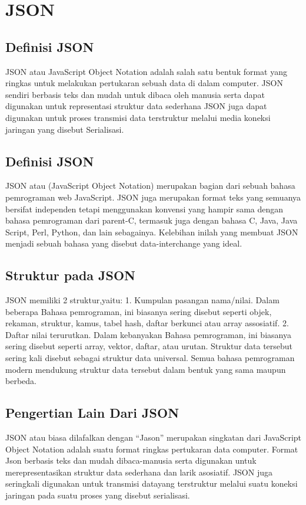 \documentclass[a4paper]{article}
\begin{document}
\section{JSON}
\subsection{Definisi JSON}
JSON atau JavaScript Object Notation adalah salah satu bentuk format yang ringkas untuk melakukan pertukaran sebuah data di dalam computer. JSON sendiri berbasis teks dan mudah untuk dibaca oleh manusia serta dapat digunakan untuk representasi struktur data sederhana JSON juga dapat digunakan untuk proses transmisi data terstruktur melalui media koneksi jaringan yang disebut Serialisasi.
\subsection{Definisi JSON}
JSON atau (JavaScript Object Notation) merupakan  bagian  dari  sebuah bahasa  pemrograman web  JavaScript.  JSON juga merupakan format teks yang semuanya bersifat independen tetapi menggunakan konvensi yang  hampir sama  dengan  bahasa  pemrograman  dari  parent-C,  termasuk juga dengan  bahasa C,  Java,  Java Script,  Perl, Python,  dan lain sebagainya.  Kelebihan  inilah  yang  membuat  JSON  menjadi  sebuah  bahasa yang disebut  data-interchange yang ideal.
\subsection{Struktur pada JSON}
JSON memiliki 2 struktur,yaitu:
1.	Kumpulan pasangan nama/nilai.
Dalam beberapa Bahasa pemrograman, ini biasanya sering disebut seperti objek, rekaman, struktur, kamus, tabel hash, daftar berkunci atau array assosiatif.
2.	Daftar nilai terurutkan.
Dalam kebanyakan Bahasa pemrograman, ini biasanya sering disebut seperti array, vektor, daftar, atau urutan.
Struktur data tersebut sering kali disebut sebagai struktur data universal. Semua bahasa pemrograman modern mendukung struktur data tersebut dalam bentuk yang sama maupun berbeda.
\subsection{Pengertian Lain Dari JSON}
JSON atau biasa dilafalkan dengan “Jason” merupakan singkatan dari JavaScript Object Notation adalah suatu format ringkas pertukaran data computer. Format Json berbasis teks dan mudah dibaca-manusia serta digunakan untuk merepresentasikan struktur data sederhana dan larik asosiatif. JSON juga seringkali digunakan untuk transmisi datayang  terstruktur melalui suatu koneksi jaringan pada suatu proses yang disebut serialisasi.
\end{document}
